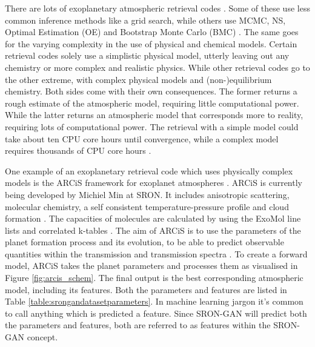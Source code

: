 There are lots of exoplanetary atmospheric retrieval codes \cite{madhusudhan2009temperature, line2013systematic, irwin2008nemesis, benneke2012atmospheric, waldmann2015tau, lavie2017helios, gandhi2017retrieval}. Some of these use less common inference methods like a grid search, while others use MCMC, NS, Optimal Estimation (OE) and Bootstrap Monte Carlo (BMC) \cite{line2013systematic}. The same goes for the varying complexity in the use of physical and chemical models. Certain retrieval codes solely use a simplistic physical model, utterly leaving out any chemistry or more complex and realistic physics. While other retrieval codes go to the other extreme, with complex physical models and (non-)equilibrium chemistry. Both sides come with their own consequences. The former returns a rough estimate of the atmospheric model, requiring little computational power. While the latter returns an atmospheric model that corresponds more to reality, requiring lots of computational power. The retrieval with a simple model could take about ten CPU core hours until convergence, while a complex model requires thousands of CPU core hours \cite{zingales2018exogan, madhusudhan2018atmospheric}.

One example of an exoplanetary retrieval code which uses physically complex models is the ARCiS framework for exoplanet atmospheres \cite{min2019arcis}. ARCiS is currently being developed by Michiel Min at SRON. It includes anisotropic scattering, molecular chemistry, a self consistent temperature-pressure profile and cloud formation \cite{ormel2019arcis}. The capacities of molecules are calculated by using the ExoMol line lists and correlated k-tables \cite{tennyson2016exomol, ormel2019arcis}. The aim of ARCiS is to use the parameters of the planet formation process and its evolution, to be able to predict observable quantities within the transmission and transmission spectra \cite{min2019arcis}. To create a forward model, ARCiS takes the planet parameters and processes them as visualised in Figure \ref{fig:arcis_schem}. The final output is the best corresponding atmospheric model, including its features. Both the parameters and features are listed in Table \ref{table:srongandatasetparameters}. In machine learning jargon it's common to call anything which is predicted a feature. Since SRON-GAN will predict both the parameters and features, both are referred to as features within the SRON-GAN concept.

